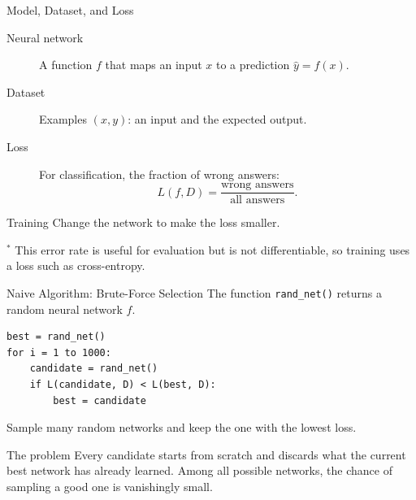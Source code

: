 \documentclass[aspectratio=169]{beamer}
\begin{document}
\begin{frame}{Model, Dataset, and Loss}
  \begin{description}
    \item[Neural network] A function $f$ that maps an input $x$ to a
      prediction $\hat y=f(x)$.
    \item[Dataset] Examples $(x,y)$: an input and the expected output.
    \item[Loss] For classification, the fraction of wrong answers:
      \begin{equation*}
        L(f,D)=\frac{\text{wrong answers}}{\text{all answers}}.
      \end{equation*}
  \end{description}

  \begin{block}{Training}
    Change the network to make the loss smaller.
  \end{block}

  \vfill
  {\footnotesize
    $^{*}$ This error rate is useful for evaluation but is not differentiable,
    so training uses a loss such as cross-entropy.
  }
\end{frame}

\begin{frame}[fragile]{Naive Algorithm: Brute-Force Selection}
  \small
  The function \texttt{rand\_net()} returns a random neural network $f$.

\begin{verbatim}
best = rand_net()
for i = 1 to 1000:
    candidate = rand_net()
    if L(candidate, D) < L(best, D):
        best = candidate
\end{verbatim}

  Sample many random networks and keep the one with the lowest loss.

  \begin{alertblock}{The problem}
    Every candidate starts from scratch and discards what the current best
    network has already learned. Among all possible networks, the chance of
    sampling a good one is vanishingly small.
  \end{alertblock}
\end{frame}
\end{document}
